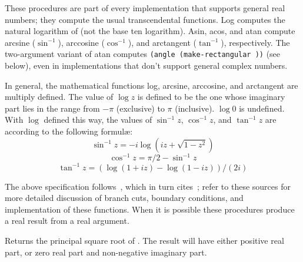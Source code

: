 \begin{entry}{%
}

These procedures are part of every implementation that supports
general
real numbers; they compute the usual transcendental functions.  {\cf Log}
computes the natural logarithm of  (not the base ten logarithm).
{\cf Asin}, {\cf acos}, and {\cf atan} compute arcsine ($\sin^{-1}$),
arccosine ($\cos^{-1}$), and arctangent ($\tan^{-1}$), respectively.
The two-argument variant of {\cf atan} computes {\tt (angle
(make-rectangular  ))} (see below), even in implementations
that don't support general complex numbers.

In general, the mathematical functions log, arcsine, arccosine, and
arctangent are multiply defined.
The value of $\log z$ is defined to be the one whose imaginary
part lies in the range from $-\pi$ (exclusive) to $\pi$ (inclusive).
$\log 0$ is undefined.
With $\log$ defined this way, the values of $\sin^{-1} z$, $\cos^{-1} z$,
and $\tan^{-1} z$ are according to the following formul\ae:
$$\sin^{-1} z = -i \log (i z + \sqrt{1 - z^2})$$
$$\cos^{-1} z = \pi / 2 - \sin^{-1} z$$
$$\tan^{-1} z = (\log (1 + i z) - \log (1 - i z)) / (2 i)$$

The above specification follows~\cite{CLtL}, which in turn
cites~\cite{Penfield81}; refer to these sources for more detailed
discussion of branch cuts, boundary conditions, and implementation of
these functions.  When it is possible these procedures produce a real
result from a real argument.


\end{entry}


\begin{entry}{%
}

Returns the principal square root of .  The result will have
either positive real part, or zero real part and non-negative imaginary
part.
\end{entry}


